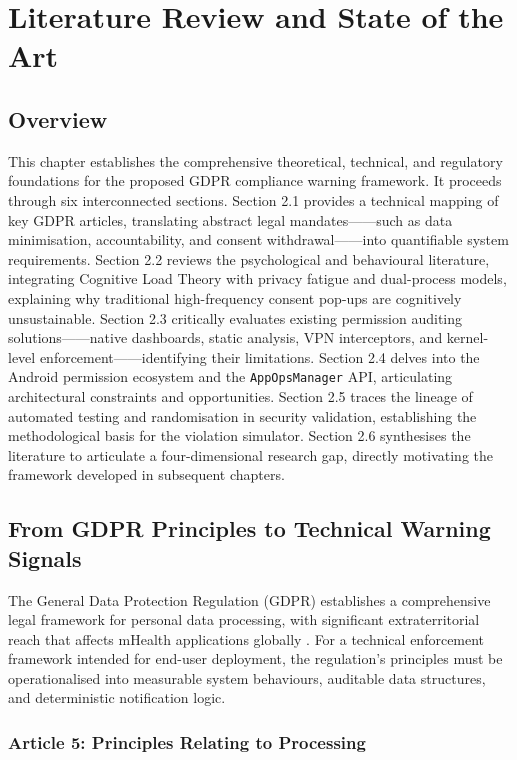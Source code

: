 \newpage
\section{Literature Review and State of the Art}

\subsection{Overview}

This chapter establishes the comprehensive theoretical, technical, and regulatory foundations for the proposed GDPR compliance warning framework. It proceeds through six interconnected sections. Section 2.1 provides a technical mapping of key GDPR articles, translating abstract legal mandates——such as data minimisation, accountability, and consent withdrawal——into quantifiable system requirements. Section 2.2 reviews the psychological and behavioural literature, integrating Cognitive Load Theory with privacy fatigue and dual-process models, explaining why traditional high-frequency consent pop-ups are cognitively unsustainable. Section 2.3 critically evaluates existing permission auditing solutions——native dashboards, static analysis, VPN interceptors, and kernel-level enforcement——identifying their limitations. Section 2.4 delves into the Android permission ecosystem and the \texttt{AppOpsManager} API, articulating architectural constraints and opportunities. Section 2.5 traces the lineage of automated testing and randomisation in security validation, establishing the methodological basis for the violation simulator. Section 2.6 synthesises the literature to articulate a four-dimensional research gap, directly motivating the framework developed in subsequent chapters.

\subsection{From GDPR Principles to Technical Warning Signals}

The General Data Protection Regulation (GDPR) establishes a comprehensive legal framework for personal data processing, with significant extraterritorial reach that affects mHealth applications globally \cite{1}. For a technical enforcement framework intended for end-user deployment, the regulation's principles must be operationalised into measurable system behaviours, auditable data structures, and deterministic notification logic.

\subsubsection{Article 5: Principles Relating to Processing}


